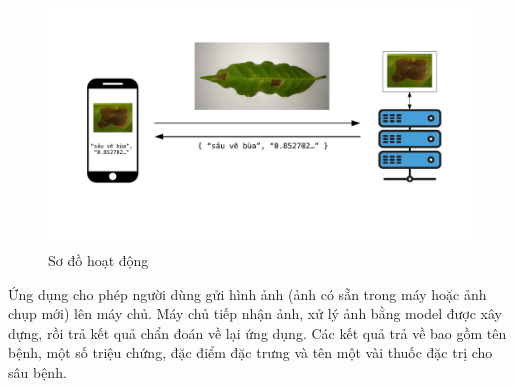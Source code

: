 \documentclass[a4paper,14pt]{extarticle}
\begin{document}
	\begin{figure}[H]
		\centering
		\includegraphics[scale=0.4]{images/chart.pdf}
		\caption{Sơ đồ hoạt động}
	\end{figure}

	Ứng dụng cho phép người dùng gửi hình ảnh (ảnh có sẵn trong máy hoặc ảnh chụp mới) lên máy chủ. Máy chủ tiếp nhận ảnh, xử lý ảnh bằng model được xây dựng, rồi trả kết quả chẩn đoán về lại ứng dụng. Các kết quả trả về bao gồm tên bệnh, một số triệu chứng, đặc điểm đặc trưng và tên một vài thuốc đặc trị cho sâu bệnh.
\end{document}
